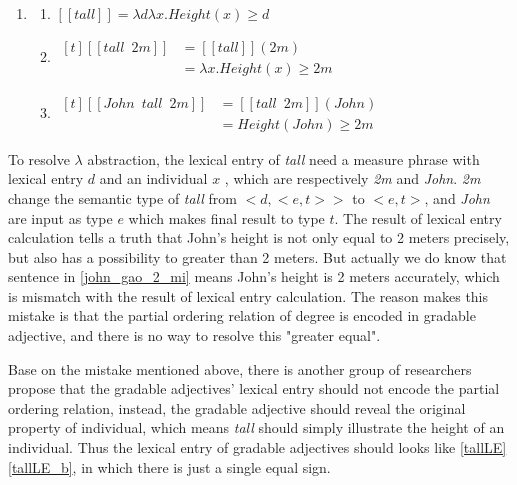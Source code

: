 \documentclass{ctexart}
\begin{document}
\begin{enumerate}[resume]
    \item \label{john_gao_2_mi_LE}
    
    \begin{enumerate}
    \item \label{john_gao_2_mi_LE_a} 
    $[\![tall]\!] = \lambda d \lambda x.Height(x) \geq d$
    
    \item \label{john_gao_2_mi_LE_b} 
    $\begin{aligned}[t]
        [\![tall \enspace 2m]\!] &= [\![tall]\!](2m) \\
        &= \lambda x.Height(x) \geq 2m
    \end{aligned}$
    
    \item \label{john_gao_2_mi_LE_c} 
    $\begin{aligned}[t]
        [\![John \enspace tall \enspace 2m]\!] &= [\![tall \enspace 2m]\!](John) \\
        &= Height(John) \geq 2m
    \end{aligned}$
    
    \end{enumerate}
\end{enumerate}

To resolve $\lambda$ abstraction, the lexical entry of \textit{tall} need a measure phrase with lexical entry $d$ and an individual $x$ , which are respectively \textit{2m} and \textit{John}. \textit{2m} change the semantic type of \textit{tall} from $<d,<e,t>>$ to $<e,t>$, and \textit{John} are input as type $e$ which makes final result to type $t$. The result of lexical entry calculation tells a truth that John's height is not only equal to 2 meters precisely, but also has a possibility to greater than 2 meters. But actually we do know that sentence in \ref{john_gao_2_mi} means John's height is 2 meters accurately, which is mismatch with the result of lexical entry calculation. The reason makes this mistake is that the partial ordering relation of degree is encoded in gradable adjective, and there is no way to resolve this "greater equal".

Base on the mistake mentioned above, there is another group of researchers propose that the gradable adjectives' lexical entry should not encode the partial ordering relation, instead, the gradable adjective should reveal the original property of individual, which means \textit{tall} should simply illustrate the height of an individual. Thus the lexical entry of gradable adjectives should looks like \ref{tallLE}\ref{tallLE_b}, in which there is just a single equal sign. 
\end{document}
